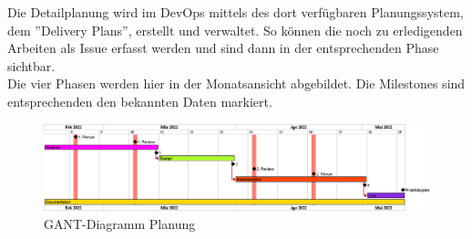 Die Detailplanung wird im DevOps mittels des dort verfügbaren Planungssystem, dem ''Delivery Plans'', erstellt und verwaltet. So können die noch zu erledigenden Arbeiten als Issue erfasst werden und sind dann in der entsprechenden Phase sichtbar.\\
Die vier Phasen werden hier in der Monatsansicht abgebildet. Die Milestones sind entsprechenden den bekannten Daten markiert.

\vspace*{3mm}

\begin{figure}[htp]
    \begin{center}
        \includegraphics[width=1\linewidth]{content/diagrams/out/planning/planning.png}
        \caption{GANT-Diagramm Planung}
      \end{center}
\end{figure}